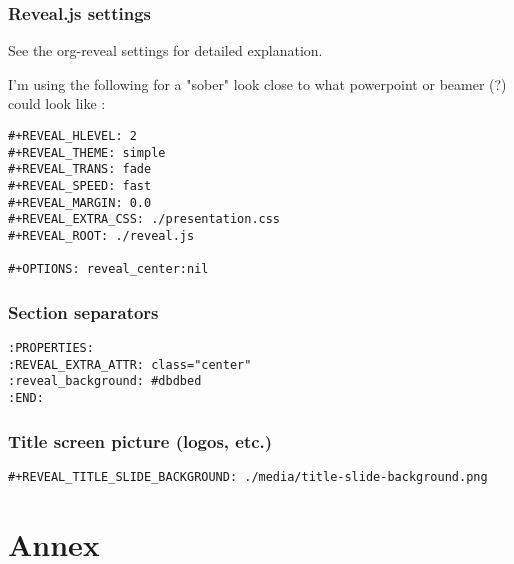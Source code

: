 \documentclass[a4paper]{article}
\begin{document}
\subsubsection{Reveal.js settings}
\label{sec:org7aab7b5}

See the org-reveal settings for detailed explanation.

I'm using the following for a "sober" look close to what
powerpoint or beamer (?) could look like :

\begin{verbatim}
#+REVEAL_HLEVEL: 2
#+REVEAL_THEME: simple
#+REVEAL_TRANS: fade
#+REVEAL_SPEED: fast
#+REVEAL_MARGIN: 0.0
#+REVEAL_EXTRA_CSS: ./presentation.css
#+REVEAL_ROOT: ./reveal.js

#+OPTIONS: reveal_center:nil
\end{verbatim}
\subsubsection{Section separators}
\label{sec:org488d6f8}

\begin{verbatim}
:PROPERTIES:
:REVEAL_EXTRA_ATTR: class="center"
:reveal_background: #dbdbed
:END:
\end{verbatim}


\subsubsection{Title screen picture (logos, etc.)}
\label{sec:org303646a}

\begin{verbatim}
#+REVEAL_TITLE_SLIDE_BACKGROUND: ./media/title-slide-background.png
\end{verbatim}


\section{Annex}
\label{sec:org795a0a7}
\end{document}
